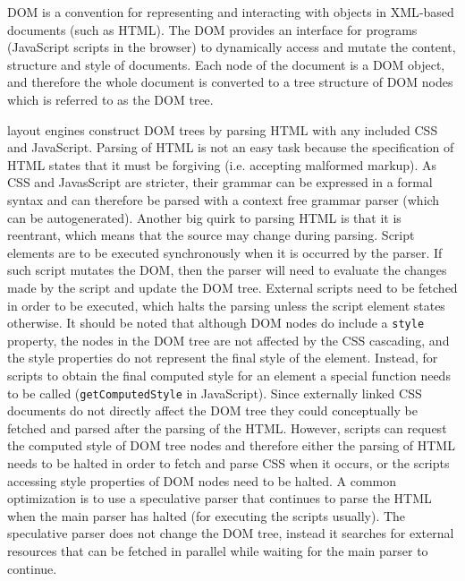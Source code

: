 \documentclass[a4paper,11pt]{kth-mag}
\newcommand{\code}[1]{\texttt{#1}}
\begin{document}
        \gls{DOM} is a convention for representing and interacting with objects in \gls{XML}-based documents (such as \gls{HTML}).
        The \gls{DOM} provides an interface for programs (\gls{JavaScript} scripts in the \gls{browser}) to dynamically access and mutate the content, structure and style of documents.
        Each node of the document is a \gls{DOM} object, and therefore the whole document is converted to a tree structure of \gls{DOM} nodes which is referred to as the \gls{DOM} tree.

        \Glspl{layout engine} construct \gls{DOM} trees by parsing \gls{HTML} with any included \gls{CSS} and \gls{JavaScript}.
        Parsing of \gls{HTML} is not an easy task because the specification of \gls{HTML} states that it must be forgiving (i.e. accepting malformed markup).
        As \gls{CSS} and JavasScript are stricter, their grammar can be expressed in a formal syntax and can therefore be parsed with a context free grammar parser (which can be autogenerated).
        Another big quirk to parsing \gls{HTML} is that it is reentrant, which means that the source may change during parsing.
        Script \glspl{element} are to be executed synchronously when it is occurred by the parser.
        If such script mutates the \gls{DOM}, then the parser will need to evaluate the changes made by the script and update the \gls{DOM} tree.
        External scripts need to be fetched in order to be executed, which halts the parsing unless the script \gls{element} states otherwise.
        It should be noted that although \gls{DOM} nodes do include a \code{style} property, the nodes in the \gls{DOM} tree are not affected by the \gls{CSS} cascading, and the style properties do not represent the final style of the \gls{element}.
        Instead, for scripts to obtain the final computed style for an \gls{element} a special function needs to be called (\code{getComputedStyle} in \gls{JavaScript}).
        Since externally linked \gls{CSS} documents do not directly affect the \gls{DOM} tree they could conceptually be fetched and parsed after the parsing of the \gls{HTML}.
        However, scripts can request the computed style of \gls{DOM} tree nodes and therefore either the parsing of \gls{HTML} needs to be halted in order to fetch and parse \gls{CSS} when it occurs, or the scripts accessing style properties of \gls{DOM} nodes need to be halted.
        A common optimization is to use a speculative parser that continues to parse the \gls{HTML} when the main parser has halted (for executing the scripts usually).
        The speculative parser does not change the \gls{DOM} tree, instead it searches for external resources that can be fetched in parallel while waiting for the main parser to continue.
\end{document}
